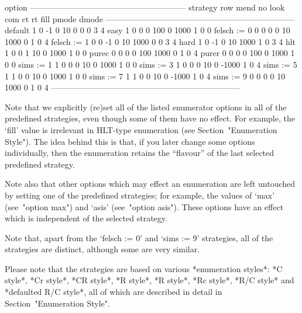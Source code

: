 \begintt
                               option
            ---------------------------------------------------------
strategy    row  mend  no  look  com    ct     rt  fill  pmode  dmode
---------------------------------------------------------------------
default       1     0  -1     0   10     0      0     0      3      4
easy          1     0   0     0  100     0   1000     1      0      0
felsch := 0   0     0   0     0   10  1000      0     1      0      4
felsch := 1   0     0  -1     0   10  1000      0     0      3      4
hard          1     0  -1     0   10  1000      1     0      3      4
hlt           1     0   0     1   10     0   1000     1      0      0
purec         0     0   0     0  100  1000      0     1      0      4
purer         0     0   0     0  100     0   1000     1      0      0
sims := 1     1     0   0     0   10     0   1000     1      0      0
sims := 3     1     0   0     0   10     0  -1000     1      0      4
sims := 5     1     1   0     0   10     0   1000     1      0      0
sims := 7     1     1   0     0   10     0  -1000     1      0      4
sims := 9     0     0   0     0   10  1000      0     1      0      4
---------------------------------------------------------------------
\endtt

Note that we explicitly (re)set all of the listed  enumerator  options
in all of the predefined strategies, even though some of them have  no
effect. For example,  the  `fill'  value  is  irrelevant  in  HLT-type
enumeration (see Section~"Enumeration Style"). The idea behind this is
that,  if  you  later  change  some  options  individually,  then  the
enumeration retains the ``flavour'' of the last selected  predefined
strategy.

Note also that other options which may effect an enumeration are  left
untouched by setting one of the predefined  strategies;  for  example,
the values of `max' (see~"option max") and `asis' (see~"option asis").
These options have an effect which  is  independent  of  the  selected
strategy.

Note that, apart from the `felsch := 0' and `sims  :=  9'  strategies,
all of the strategies are distinct, although some are very similar.


Please note that the strategies  are  based  on  various  *enumeration
styles*: *C style*, *Cr style*, *CR style*, *R  style*,  *R\*  style*,
*Rc style*, *R/C style* and *defaulted R/C style*, all  of  which  are
described in detail in Section~"Enumeration Style".

